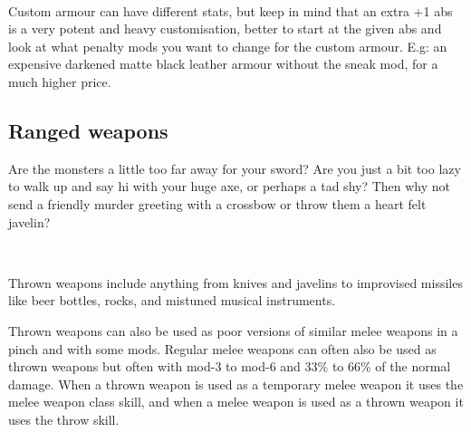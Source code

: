 \

Custom armour can have different stats, but keep in mind that an extra +1 abs is a very potent and heavy customisation, better to start at the given abs and look at what penalty mods you want to change for the custom armour. E.g: an expensive darkened matte black leather armour without the sneak mod, for a much higher price.


\subsection*{Ranged weapons}

Are the monsters a little too far away for your sword? Are you just a bit too lazy to walk up and say hi with your huge axe, or perhaps a tad shy? Then why not send a friendly murder greeting with a crossbow or throw them a heart felt javelin?

\

\noindent Thrown weapons include anything from knives and javelins to improvised missiles like beer bottles, rocks, and mistuned musical instruments.

Thrown weapons can also be used as poor versions of similar melee weapons in a pinch and with some mods. Regular melee weapons can often also be used as thrown weapons but often with mod-3 to mod-6 and 33\% to 66\% of the normal damage. When a thrown weapon is used as a temporary melee weapon it uses the melee weapon class skill, and when a melee weapon is used as a thrown weapon it uses the throw skill.

\

